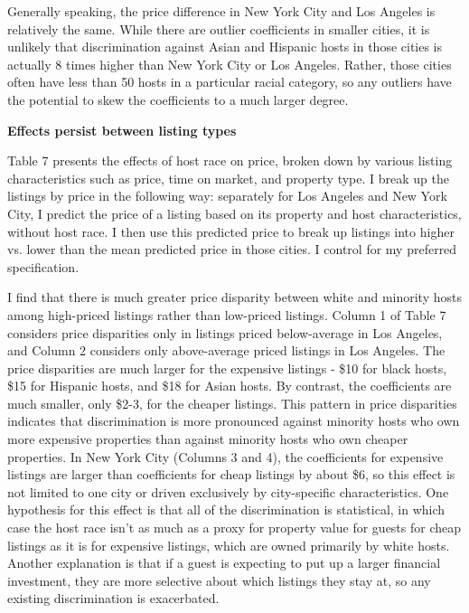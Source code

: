 Generally speaking, the price difference in New York City and Los Angeles is relatively the same. While there are outlier coefficients in smaller cities, it is unlikely that discrimination against Asian and Hispanic hosts in those cities is actually 8 times higher than New York City or Los Angeles. Rather, those cities often have less than 50 hosts in a particular racial category, so any outliers have the potential to skew the coefficients to a much larger degree.  

\textbf{Effects persist between listing types}

Table 7 presents the effects of host race on price, broken down by various listing characteristics such as price, time on market, and property type. I break up the listings by price in the following way: separately for Los Angeles and New York City, I predict the price of a listing based on its property and host characteristics, without host race. I then use this predicted price to break up listings into higher vs. lower than the mean predicted price in those cities. I control for my preferred specification.  

I find that there is much greater price disparity between white and minority hosts among high-priced listings rather than low-priced listings. Column 1 of Table 7 considers price disparities only in listings priced below-average in Los Angeles, and Column 2 considers only above-average priced listings in Los Angeles. The price disparities are much larger for the expensive listings - \$10 for black hosts, \$15 for Hispanic hosts, and \$18 for Asian hosts. By contrast, the coefficients are much smaller, only \$2-3, for the cheaper listings. This pattern in price disparities indicates that discrimination is more pronounced against minority hosts who own more expensive properties than against minority hosts who own cheaper properties. In New York City (Columns 3 and 4), the coefficients for expensive listings are larger than coefficients for cheap listings by about \$6, so this effect is not limited to one city or driven exclusively by city-specific characteristics. One hypothesis for this effect is that all of the discrimination is statistical, in which case the host race isn't as much as a proxy for property value for guests for cheap listings  as it is for expensive listings, which are owned primarily by white hosts. Another explanation is that if a guest is expecting to put up a larger financial investment, they are more selective about which listings they stay at, so any existing discrimination is exacerbated. 

